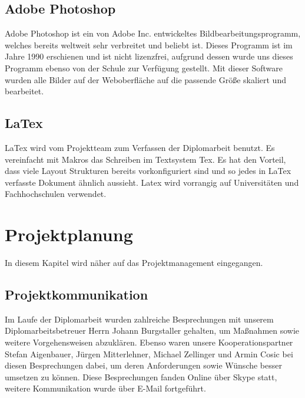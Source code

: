 \subsection{Adobe Photoshop}
Adobe Photoshop ist ein von Adobe Inc. entwickeltes Bildbearbeitungsprogramm, welches bereits weltweit sehr verbreitet und beliebt ist. Dieses Programm ist im Jahre 1990 erschienen und ist nicht lizenzfrei, aufgrund dessen wurde uns dieses Programm ebenso von der Schule zur Verfügung gestellt. Mit dieser Software wurden alle Bilder auf der Weboberfläche auf die passende Größe skaliert und bearbeitet. 

\subsection{LaTex}
LaTex wird vom Projektteam zum Verfassen der Diplomarbeit benutzt. Es vereinfacht mit Makros das Schreiben im Textsystem Tex. Es hat den Vorteil, dass viele Layout Strukturen bereits vorkonfiguriert sind und so jedes in LaTex verfasste Dokument ähnlich aussieht. Latex wird vorrangig auf Universitäten und Fachhochschulen verwendet.

\newpage
\section{Projektplanung}
	
In diesem Kapitel wird näher auf das Projektmanagement eingegangen.


\subsection{Projektkommunikation}
Im Laufe der Diplomarbeit wurden zahlreiche Besprechungen mit unserem Diplomarbeitsbetreuer Herrn Johann Burgstaller gehalten, um Maßnahmen sowie weitere Vorgehensweisen abzuklären. Ebenso waren unsere Kooperationspartner Stefan Aigenbauer, Jürgen Mitterlehner, Michael Zellinger und Armin Cosic bei diesen Besprechungen dabei, um deren Anforderungen sowie Wünsche besser umsetzen zu können. Diese Besprechungen fanden Online über Skype statt, weitere Kommunikation wurde über E-Mail fortgeführt. 


